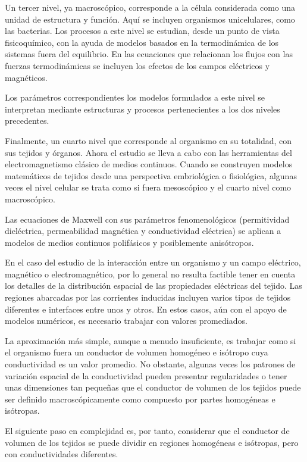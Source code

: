 Un tercer nivel, ya macroscópico, corresponde a la célula considerada como una unidad de estructura y función. Aquí se incluyen organismos unicelulares, como las bacterias.
Los procesos a este nivel se estudian, desde un punto de vista fisicoquímico, con la ayuda de modelos basados en la termodinámica de los sistemas fuera del equilibrio.
En las ecuaciones que relacionan los flujos con las fuerzas termodinámicas se incluyen los efectos de los campos eléctricos y magnéticos.

Los parámetros correspondientes los modelos formulados a este nivel se interpretan mediante estructuras y procesos pertenecientes a los dos niveles precedentes.

Finalmente, un cuarto nivel que corresponde al organismo en su totalidad, con sus tejidos y órganos. Ahora el estudio se lleva a cabo con las herramientas del electromagnetismo clásico de medios continuos. Cuando se construyen modelos matemáticos de tejidos desde una perspectiva embriológica o fisiológica, algunas veces el nivel celular se trata como si fuera mesoscópico y el cuarto nivel como macroscópico.

Las ecuaciones de Maxwell con sus parámetros fenomenológicos (permitividad dieléctrica, permeabilidad magnética y conductividad eléctrica) se aplican a modelos de medios continuos polifásicos y posiblemente anisótropos.

En el caso del estudio de la interacción entre un organismo y un campo eléctrico, magnético o electromagnético, por lo general no resulta factible tener en cuenta los detalles de la distribución espacial de las propiedades eléctricas del tejido. Las regiones abarcadas por las corrientes inducidas incluyen varios tipos de tejidos diferentes e interfaces entre unos y otros. En estos casos, aún con el apoyo de modelos numéricos, es necesario trabajar con valores promediados.

La aproximación más simple, aunque a menudo insuficiente, es trabajar como si el organismo fuera un conductor de volumen homogéneo e isótropo cuya conductividad es un valor promedio. No obstante, algunas veces los patrones de variación espacial de la conductividad pueden presentar regularidades o tener unas dimensiones tan pequeñas que el conductor de volumen de los tejidos puede ser definido macroscópicamente como compuesto por partes homogéneas e isótropas.

El siguiente paso en complejidad es, por tanto, considerar que el conductor de volumen de los tejidos se puede dividir en regiones homogéneas e isótropas, pero con conductividades diferentes.

